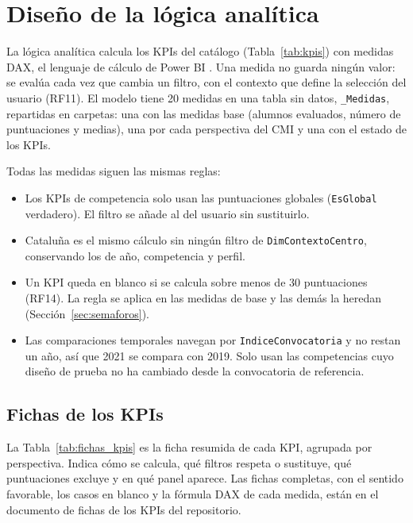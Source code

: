 \documentclass[12pt, a4paper, oneside]{report}
\begin{document}
\section{Diseño de la lógica analítica}
\label{sec:diseno_dax}
La lógica analítica calcula los KPIs del catálogo (Tabla~\ref{tab:kpis}) con medidas DAX, el lenguaje de cálculo de Power BI \cite{ferrari2019definitive}. Una medida no guarda ningún valor: se evalúa cada vez que cambia un filtro, con el contexto que define la selección del usuario (RF11). El modelo tiene 20 medidas en una tabla sin datos, \texttt{\_Medidas}, repartidas en carpetas: una con las medidas base (alumnos evaluados, número de puntuaciones y medias), una por cada perspectiva del CMI y una con el estado de los KPIs.

Todas las medidas siguen las mismas reglas:
\begin{itemize}
    \item Los KPIs de competencia solo usan las puntuaciones globales (\texttt{EsGlobal} verdadero). El filtro se añade al del usuario sin sustituirlo.
    \item \guillemotleft{}Cataluña\guillemotright{} es el mismo cálculo sin ningún filtro de \texttt{DimContextoCentro}, conservando los de año, competencia y perfil.
    \item Un KPI queda en blanco si se calcula sobre menos de 30 puntuaciones (RF14). La regla se aplica en las medidas de base y las demás la heredan (Sección~\ref{sec:semaforos}).
    \item Las comparaciones temporales navegan por \texttt{IndiceConvocatoria} y no restan un año, así que 2021 se compara con 2019. Solo usan las competencias cuyo diseño de prueba no ha cambiado desde la convocatoria de referencia.
\end{itemize}

\subsection{Fichas de los KPIs}
\label{sec:fichas_kpis}
La Tabla~\ref{tab:fichas_kpis} es la ficha resumida de cada KPI, agrupada por perspectiva. Indica cómo se calcula, qué filtros respeta o sustituye, qué puntuaciones excluye y en qué panel aparece. Las fichas completas, con el sentido favorable, los casos en blanco y la fórmula DAX de cada medida, están en el documento de fichas de los KPIs del repositorio.
\end{document}
